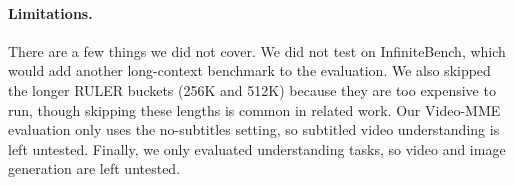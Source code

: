 \paragraph{Limitations.}
There are a few things we did not cover. We did not test on InfiniteBench, which would add another long-context benchmark to the evaluation. We also skipped the longer RULER buckets (256K and 512K) because they are too expensive to run, though skipping these lengths is common in related work. Our Video-MME evaluation only uses the no-subtitles setting, so subtitled video understanding is left untested. Finally, we only evaluated understanding tasks, so video and image generation are left untested.

\newpage




